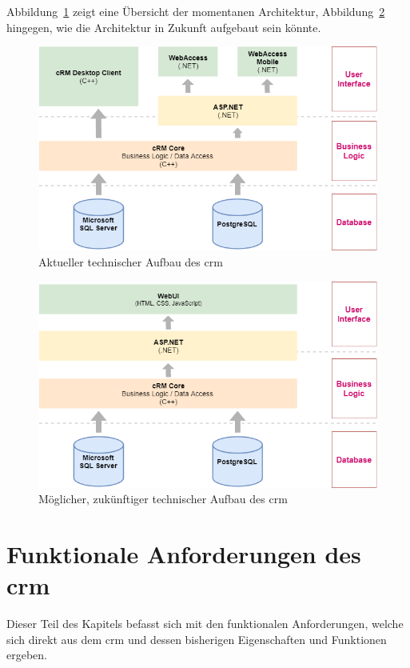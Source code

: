 Abbildung~\ref{fig:crm_technical_stack} zeigt eine Übersicht der momentanen Architektur, Abbildung~\ref{fig:crm_future_technical_stack} hingegen, wie die Architektur in Zukunft aufgebaut sein könnte.

\begin{figure}
    \centering
    \captionsetup{justification=centering}
    \includegraphics[width=\textwidth]{figures/crm_technical_stack.png}
        \caption{Aktueller technischer Aufbau des \gls{crm}}\label{fig:crm_technical_stack}
\end{figure}

\begin{figure}
    \centering
    \captionsetup{justification=centering}
    \includegraphics[width=\textwidth]{figures/crm_future_technical_stack.png}
        \caption{Möglicher, zukünftiger technischer Aufbau des \gls{crm}}\label{fig:crm_future_technical_stack}
\end{figure}


\section{Funktionale Anforderungen des \acrlong{crm}}
Dieser Teil des Kapitels befasst sich mit den funktionalen Anforderungen, welche sich direkt aus dem \gls{crm} und dessen bisherigen Eigenschaften und Funktionen ergeben.

